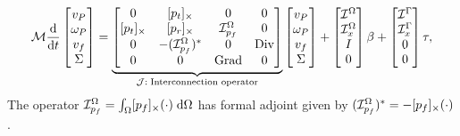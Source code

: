 \begin{equation}
\label{eq:ph_mfd}
\mathcal{M}
\diff{}{t}
\begin{bmatrix}
v_P \\ \omega_P  \\ v_f  \\ \Sigma \\
\end{bmatrix} = 
\underbrace{\begin{bmatrix}
0 & \crmat{p_t} & 0 & 0 \\
\crmat{p_t} & \crmat{p_r} & \mathcal{I}_{p_f}^\Omega & 0 \\
0 & -(\mathcal{I}_{p_f}^\Omega)^* & 0 & \Div \\
0 & 0 & \Grad & 0 \\
\end{bmatrix}}_{\mathcal{J}: \; \text{Interconnection operator}}
\begin{bmatrix}
v_P \\ \omega_P  \\ v_f  \\ \Sigma \\
\end{bmatrix} + 
\begin{bmatrix}
\mathcal{I}^\Omega \\
\mathcal{I}_{x}^\Omega \\
I \\
0 \\
\end{bmatrix}
\beta + 
\begin{bmatrix}
\mathcal{I}^\Gamma \\
\mathcal{I}_{x}^\Gamma \\
0 \\
0 \\
\end{bmatrix} \tau,
\end{equation}
The operator $\mathcal{I}_{p_f}^\Omega = \int_\Omega \crmat{p_f}(\cdot) \d{\Omega}$ has formal adjoint  given by $(\mathcal{I}_{p_f}^\Omega)^* = - [p_f]_{\times}(\cdot)$.\\

